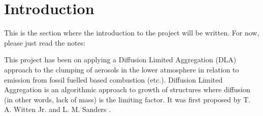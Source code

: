 \section{Introduction}

This is the section where the introduction to the project will be written. For now, please just read the notes: 

This project has been on applying a Diffusion Limited Aggregation (DLA) approach to the clumping of aerosols in the lower atmosphere in relation to emission from fossil fuelled based combustion (etc.). Diffusion Limited Aggregation is an algorithmic approach to growth of structures where diffusion (in other words, lack of mass) is the limiting factor. It was first proposed by T. A. Witten Jr. and L. M. Sanders \cite{PhysRevLett.47.1400}.